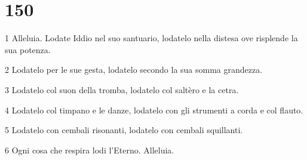 \chapter{150}

\par 1 Alleluia. Lodate Iddio nel suo santuario, lodatelo nella distesa ove risplende la sua potenza.
\par 2 Lodatelo per le sue gesta, lodatelo secondo la sua somma grandezza.
\par 3 Lodatelo col suon della tromba, lodatelo col saltèro e la cetra.
\par 4 Lodatelo col timpano e le danze, lodatelo con gli strumenti a corda e col flauto.
\par 5 Lodatelo con cembali risonanti, lodatelo con cembali squillanti.
\par 6 Ogni cosa che respira lodi l'Eterno. Alleluia.


